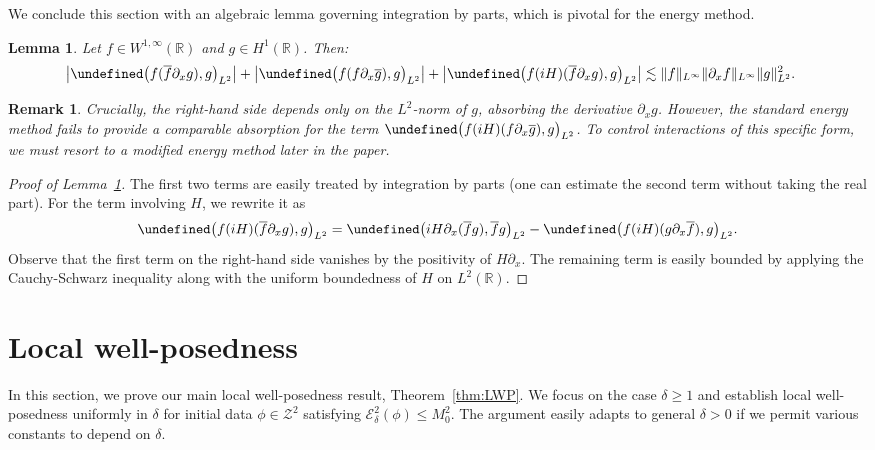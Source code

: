 \documentclass{amsart}
\newtheorem{lemma}[proposition]{Lemma}
\newtheorem{remark}{Remark}[section]
\numberwithin{equation}{section}
\newcommand{\R}{\mathbb{R}}
\let\Re=\undefined\DeclareMathOperator{\Re}{Re}
\begin{document}
We conclude this section with an algebraic lemma governing integration by parts, which is pivotal for the energy method.
\begin{lemma}\label{lem:ibp}
Let $f\in W^{1,\infty}(\R)$ and $g\in H^1(\R)$. Then:
\begin{align*}
&\big| \Re \big( f(\overline{f}\partial_xg),g \big)_{L^2} \big| + \big| \Re \big( f(f\partial_x\overline{g}),g\big)_{L^2} \big| + \big| \Re \big( f(iH)(\overline{f}\partial_xg),g\big)_{L^2} \big| \lesssim \| f\|_{L^\infty}\| \partial_xf\|_{L^\infty}\| g\|_{L^2}^2.
\end{align*}
\end{lemma}
\begin{remark}
Crucially, the right-hand side depends only on the $L^2$-norm of $g$, absorbing the derivative $\partial_x g$. However, the standard energy method fails to provide a comparable absorption for the term $\Re \big( f(iH)(f\partial_x\overline{g}),g\big)_{L^2}$. To control interactions of this specific form, we must resort to a modified energy method later in the paper.
\end{remark}

\begin{proof}[Proof of Lemma~\ref{lem:ibp}]
The first two terms are easily treated by integration by parts (one can estimate the second term without taking the real part).
For the term involving $H$, we rewrite it as
\[ \Re \big( f(iH)(\overline{f}\partial_xg),g\big)_{L^2} = \Re \big( iH\partial_x(\overline{f}g),\overline{f}g\big)_{L^2} - \Re \big( f(iH)(g\partial_x\overline{f}),g\big)_{L^2}.\]
Observe that the first term on the right-hand side vanishes by the positivity of $H\partial_x$. The remaining term is easily bounded by applying the Cauchy-Schwarz inequality along with the uniform boundedness of $H$ on $L^2(\R)$.
\end{proof}
 




\section{Local well-posedness}
\label{sec3}

In this section, we prove our main local well-posedness result, Theorem~\ref{thm:LWP}.  We focus on the case $\delta \geq 1$ and establish local well-posedness uniformly in $\delta$ for initial data $\phi\in \mathcal{Z}^2$ satisfying $\mathcal{E}^2_\delta(\phi) \leq M_0^2$. The argument easily adapts to general $\delta > 0$ if we permit various constants to depend on $\delta$.
\end{document}
